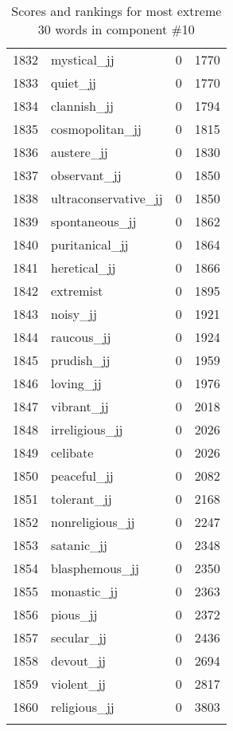 \begin{longtable}[!htbp]{| rlr@{.}l |}
    1832 & mystical\_jj & 0 & 1770 \\
    1833 & quiet\_jj & 0 & 1770 \\
    1834 & clannish\_jj & 0 & 1794 \\
    1835 & cosmopolitan\_jj & 0 & 1815 \\
    1836 & austere\_jj & 0 & 1830 \\
    1837 & observant\_jj & 0 & 1850 \\
    1838 & ultraconservative\_jj & 0 & 1850 \\
    1839 & spontaneous\_jj & 0 & 1862 \\
    1840 & puritanical\_jj & 0 & 1864 \\
    1841 & heretical\_jj & 0 & 1866 \\
    1842 & extremist & 0 & 1895 \\
    1843 & noisy\_jj & 0 & 1921 \\
    1844 & raucous\_jj & 0 & 1924 \\
    1845 & prudish\_jj & 0 & 1959 \\
    1846 & loving\_jj & 0 & 1976 \\
    1847 & vibrant\_jj & 0 & 2018 \\
    1848 & irreligious\_jj & 0 & 2026 \\
    1849 & celibate & 0 & 2026 \\
    1850 & peaceful\_jj & 0 & 2082 \\
    1851 & tolerant\_jj & 0 & 2168 \\
    1852 & nonreligious\_jj & 0 & 2247 \\
    1853 & satanic\_jj & 0 & 2348 \\
    1854 & blasphemous\_jj & 0 & 2350 \\
    1855 & monastic\_jj & 0 & 2363 \\
    1856 & pious\_jj & 0 & 2372 \\
    1857 & secular\_jj & 0 & 2436 \\
    1858 & devout\_jj & 0 & 2694 \\
    1859 & violent\_jj & 0 & 2817 \\
    1860 & religious\_jj & 0 & 3803 \\
    \hline
    \caption{Scores and rankings for most extreme 30 words in component \#10} \\
\end{longtable}
